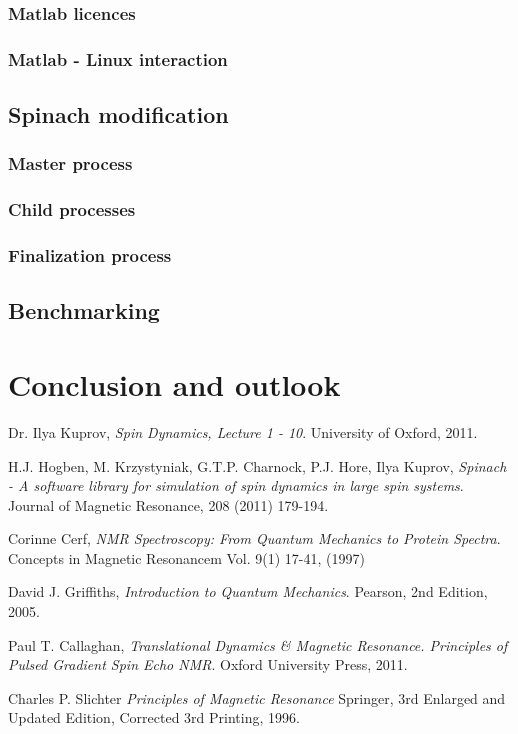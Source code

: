 \documentclass[11.5pt,a4paper]{article}
\begin{document}
\subsubsection{Matlab licences}
\subsubsection{Matlab - Linux interaction}

\subsection{Spinach modification}
\subsubsection{Master process}
\subsubsection{Child processes}
\subsubsection{Finalization process}

\subsection{Benchmarking}

\section{Conclusion and outlook}

\FloatBarrier
\begin{thebibliography}{9}
  Dr. Ilya Kuprov,
  \emph{Spin Dynamics, Lecture 1 - 10}.
  University of Oxford,
  2011.

  H.J. Hogben, M. Krzystyniak, G.T.P. Charnock, P.J. Hore, Ilya Kuprov,
  \emph{Spinach - A software library for simulation of spin dynamics in large spin systems}.
  Journal of Magnetic Resonance,
  208 (2011) 179-194.

  Corinne Cerf,
  \emph{NMR Spectroscopy: From Quantum Mechanics to Protein Spectra}.
  Concepts in Magnetic Resonancem Vol. 9(1) 17-41, (1997)

  David J. Griffiths,
  \emph{Introduction to Quantum Mechanics}.
  Pearson, 
  2nd Edition, 
  2005.

  Paul T. Callaghan,
  \emph{Translational Dynamics \& Magnetic Resonance. Principles of Pulsed Gradient Spin Echo NMR}.
  Oxford University Press,
  2011.

  Charles P. Slichter
  \emph{Principles of Magnetic Resonance}
  Springer,
  3rd Enlarged and Updated Edition, Corrected 3rd Printing,
  1996.

\end{thebibliography}
\end{document}
